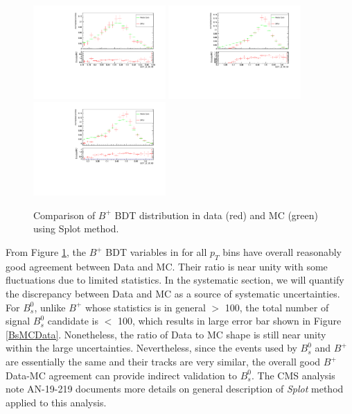 \begin{figure}[h]
\begin{center}
\includegraphics[width=0.45\textwidth]{Figures/Chapter4/BDT_pt_30_40_mc_validation_Bu.pdf}
\includegraphics[width=0.45\textwidth]{Figures/Chapter4/BDT_pt_40_50_mc_validation_Bu.pdf}
\includegraphics[width=0.45\textwidth]{Figures/Chapter4/BDT_pt_50_60_mc_validation_Bu.pdf}
\caption{Comparison of $B^+$ BDT distribution in data (red) and MC (green) using Splot method.}
\label{BPMCData}
\end{center}
\end{figure}

From Figure \ref{BPMCData}, the $B^+$ BDT variables in for all $p_T$ bins have overall reasonably good agreement between Data and MC. Their ratio is near unity with some fluctuations due to limited statistics. In the systematic section, we will quantify the discrepancy between Data and MC as a source of systematic uncertainties. For $B^0_s$, unlike $B^+$ whose statistics is in general $>$ 100, the total number of signal $B^0_s$ candidate is $<$ 100, which results in large error bar shown in Figure \ref{BsMCData}. Nonetheless, the ratio of Data to MC shape is still near unity within the large uncertainties. Nevertheless, since the events used by $B^0_s$ and $B^+$ are essentially the same and their tracks are very similar, the overall good $B^+$ Data-MC agreement can provide indirect validation to $B^0_s$. The CMS analysis note AN-19-219 \cite{AN-19-219} documents more details on general description of \textit{Splot} method applied to this analysis.  


